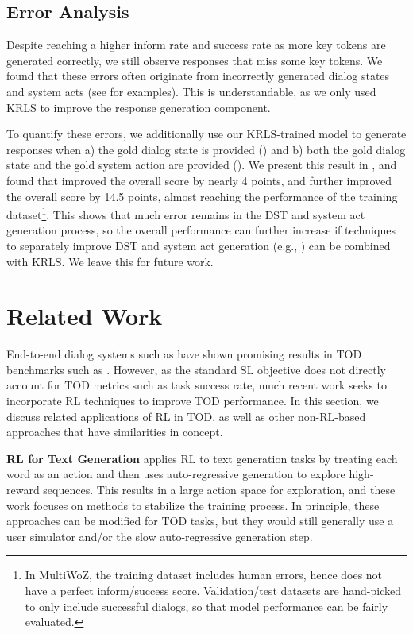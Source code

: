 \subsection{Error Analysis}
\label{subsec:Error Analysis}
Despite reaching a higher inform rate and success rate as more key tokens are generated correctly, we still observe responses that miss some key tokens. We found that these errors often originate from incorrectly generated dialog states and system acts (see  for examples). This is understandable, as we only used KRLS to improve the response generation component. 

To quantify these errors, we additionally use our KRLS-trained model to generate responses when a) the gold dialog state is provided () and b) both the gold dialog state and the gold system action are provided (). We present this result in , and found that  improved the overall score by nearly 4 points, and  further improved the overall score by 14.5 points, almost reaching the performance of the training dataset\footnote{
In MultiWoZ, the training dataset includes human errors, hence does not have a perfect inform/success score. Validation/test datasets are hand-picked to only include successful dialogs, so that model performance can be fairly evaluated.}. 
This shows that much error remains in the DST and system act generation process, so the overall performance can further increase if techniques to separately improve DST and system act generation (e.g., \citet{mars}) can be combined with KRLS. We leave this for future work.
\section{Related Work}
\label{sec:Related Work}

End-to-end dialog systems such as \citet{e2e-tod,ubar,mttod,galaxy} have shown promising results in TOD benchmarks such as . However, as the standard SL objective does not directly account for TOD metrics such as task success rate, much recent work seeks to incorporate RL techniques to improve TOD performance. In this section, we discuss related applications of RL in TOD, as well as other non-RL-based approaches that have similarities in concept.

\textbf{RL for Text Generation}
\citet{mixer, deep-rl-for-gen, mix-on-and-off-policy, rl4lm} applies RL to text generation tasks by treating each word as an action and then uses auto-regressive generation to explore high-reward sequences.
This results in a large action space for exploration, and these work focuses on methods to stabilize the training process. In principle, these approaches can be modified for TOD tasks, but they would still generally use a user simulator and/or the slow auto-regressive generation step.

